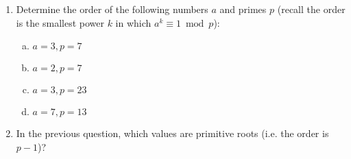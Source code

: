 \documentclass[12pt]{amsart}
\theoremstyle{plain}
\theoremstyle{definition}
\theoremstyle{remark}
\begin{document}
\begin{enumerate}[1.]
\begin{enumerate}[a.]
\begin{framed}
				\vspace{.3in}
				\end{framed}
		\end{enumerate}
		\item Determine the order of the following numbers $a$ and primes $p$ (recall the order is the smallest power $k$ in which $a^k \equiv 1 \bmod p$):
		\begin{enumerate}[a.]
			\item $a = 3, p = 7$
				\begin{framed}
				\vspace{.5in}
				\end{framed}
		     \item $a = 2, p = 7$
				\begin{framed}
				\vspace{.5in}
				\end{framed}
			\item $a = 3, p = 23$
				\begin{framed}
				\vspace{.5in}
				\end{framed}
			\newpage \item $a = 7, p = 13$
				\begin{framed}
				\vspace{.5in}
				\end{framed}
		\end{enumerate}         
		\item In the previous question, which values are primitive roots (i.e. the order is $p-1$)?
				\begin{framed}
				\vspace{.5in}
				\end{framed}
		

\end{enumerate}
\end{document}
